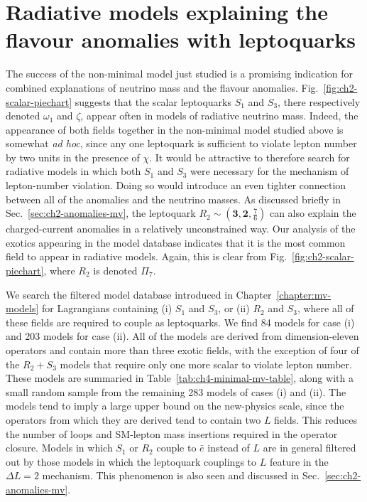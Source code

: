 \section{Radiative models explaining the flavour anomalies with leptoquarks}

The success of the non-minimal model just studied is a promising indication for
combined explanations of neutrino mass and the flavour anomalies.
Fig.~\ref{fig:ch2-scalar-piechart} suggests that the scalar leptoquarks $S_{1}$
and $S_3$, there respectively denoted $\omega_{1}$ and $\zeta$, appear often in
models of radiative neutrino mass. Indeed, the appearance of both fields
together in the non-minimal model studied above is somewhat \textit{ad hoc},
since any one leptoquark is sufficient to violate lepton number by two units in
the presence of $\chi$. It would be attractive to therefore search for radiative
models in which both $S_{1}$ and $S_{3}$ were necessary for the mechanism of
lepton-number violation. Doing so would introduce an even tighter connection
between all of the anomalies and the neutrino masses. As discussed briefly in
Sec.~\ref{sec:ch2-anomalies-mv}, the leptoquark
$R_{2} \sim (\mathbf{3}, \mathbf{2}, \tfrac{7}{6})$ can also explain the
charged-current anomalies in a relatively unconstrained way. Our analysis of the
exotics appearing in the model database indicates that it is the most common
field to appear in radiative models. Again, this is clear from
Fig.~\ref{fig:ch2-scalar-piechart}, where $R_{2}$ is denoted $\Pi_{7}$.

We search the filtered model database introduced in
Chapter~\ref{chapter:mv-models} for Lagrangians containing (i) $S_{1}$ and
$S_{3}$, or (ii) $R_{2}$ and $S_{3}$, where all of these fields are required to
couple as leptoquarks. We find 84 models for case (i) and 203 models for case
(ii). All of the models are derived from dimension-eleven operators and contain
more than three exotic fields, with the exception of four of the $R_{2} + S_{3}$
models that require only one more scalar to violate lepton number. These models
are summaried in Table~\ref{tab:ch4-minimal-mv-table}, along with a small random
sample from the remaining 283 models of cases (i) and (ii). The models tend to
imply a large upper bound on the new-physics scale, since the operators from
which they are derived tend to contain two $L$ fields. This reduces the number
of loops and SM-lepton mass insertions required in the operator closure. Models
in which $S_{1}$ or $R_{2}$ couple to $\bar{e}$ instead of $L$ are in general
filtered out by those models in which the leptoquark couplings to $L$ feature in
the $\Delta L = 2$ mechanism. This phenomenon is also seen and discussed in
Sec.~\ref{sec:ch2-anomalies-mv}.

